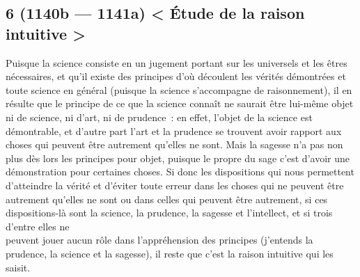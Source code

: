 \documentclass[french,twoside]{book} %
\begin{document}
\subsection[{6 (1140b — 1141a) < Étude de la raison intuitive >}]{6 (1140b — 1141a) < Étude de la raison intuitive >}
\noindent Puisque la science consiste en un jugement portant sur les universels et les êtres nécessaires, et qu’il existe des principes d’où découlent les vérités démontrées et toute science en général (puisque la science s’accompagne de raisonnement), il en résulte que le principe de ce que la science connaît ne saurait être lui-même objet ni de science, ni d’art, ni de prudence : en effet, l’objet de la science est démontrable, et d’autre part l’art et la prudence se trouvent avoir rapport aux \\
choses qui peuvent être autrement qu’elles ne sont. Mais la  sagesse n’a pas non plus dès lors les principes pour objet, puisque le propre du sage c’est d’avoir une démonstration pour certaines choses. Si donc les dispositions qui nous permettent d’atteindre la vérité et d’éviter toute erreur dans les choses qui ne peuvent être autrement qu’elles ne sont ou dans celles qui peuvent être autrement, si ces dispositions-là sont la science, la prudence, la sagesse et l’intellect, et si trois d’entre elles ne \\
peuvent jouer aucun rôle dans l’appréhension des principes (j’entends la prudence, la science et la sagesse), il reste que c’est la raison intuitive qui les saisit.
\end{document}
